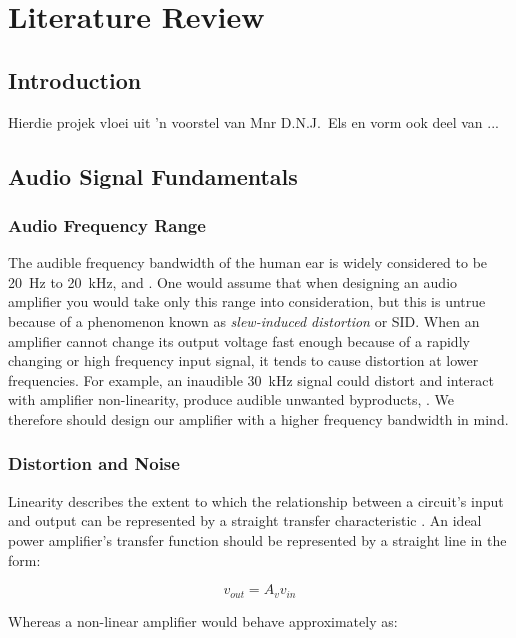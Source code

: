 \chapter{Literature Review}
\section{Introduction}

Hierdie projek vloei uit 'n voorstel van Mnr D.N.J.\ Els en vorm
ook deel van ...

\section{Audio Signal Fundamentals}

\subsection{Audio Frequency Range}

The audible frequency bandwidth of the human ear is widely considered to be \SI{20}{\hertz} to \SI{20}{\kilo\hertz}, \cite[p.~20]{Self:2009} and \cite[p.~42]{Slone:1999}. One would assume that when designing an audio amplifier you would take only this range into consideration, but this is untrue because of a phenomenon known as \textit{slew-induced distortion} or SID. When an amplifier cannot change its output voltage fast enough because of a rapidly changing or high frequency input signal, it tends to cause distortion at lower frequencies. For example, an inaudible \SI{30}{\kilo\hertz} signal could distort and interact with amplifier non-linearity, produce audible unwanted byproducts, \cite[p.~43]{Slone:1999}. We therefore should design our amplifier with a higher frequency bandwidth in mind.

\subsection{Distortion and Noise}

Linearity describes the extent to which the relationship between a circuit's input and output can be represented by a straight transfer characteristic \citep[p.~428]{Self:2009}. An ideal power amplifier's transfer function should be represented by a straight line in the form:

\begin{equation}
	v_{out} = A_v v_{in}
\end{equation}

Whereas a non-linear amplifier would behave approximately as:

